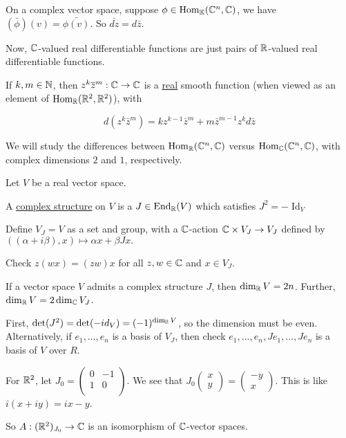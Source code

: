 \documentclass[x11names,reqno,14pt]{extarticle}
\begin{document}
On a complex vector space, suppose $\phi\in{\mathrm{Hom}}_{\mathbb{K}}(\mathbb{C}^n,\mathbb{C})$, we have $(\bar{\phi})(v) = \bar{\phi(v)}.$ So $\bar{dz} = d\bar{z}$. 

Now, $\mathbb{C}$-valued real differentiable functions are just pairs of $\mathbb{R}$-valued real differentiable functions. 

\exm

If $k, m \in \mathbb{N}$, then $z^k\overline{z}^m:\mathbb{C}\to\mathbb{C}$ is a \underline{real} smooth function (when viewed as an element of ${\mathrm{Hom}}_{\mathbb{R}}(\mathbb{R}^2, \mathbb{R}^2)$), with

\[
d(z^k\bar{z}^m) = kz^{k - 1}\bar{z}^m + m\bar{z}^{m - 1}z^kd\bar{z}
\]

We will study the differences between ${\mathrm{Hom}}_{\mathbb{R}}(\mathbb{C}^n, \mathbb{C})$ versus ${\mathrm{Hom}}_{\mathbb{C}}(\mathbb{C}^n, \mathbb{C})$, with complex dimensions $2$ and $1$, respectively. 

 Let $V$ be a real vector space. 

A \underline{complex structure} on $V$ is a $J \in {\mathrm{End}}_{\mathbb{R}}(V)$ which satisfies $J^2 = -\operatorname{Id}_V$

\prop Define $V_J = V$ as a set and group, with a $\mathbb{C}$-action $\mathbb{C}\times V_J \to V_J$ defined by $((\alpha + i\beta), x) \mapsto \alpha x + \beta Jx.$

\proof Check $z(wx) = (zw)x$ for all $z, w \in \mathbb{C}$ and $x \in V_J$. 

\prop If a vector space $V$ admits a complex structure $J$, then $\dim_{\mathbb{R}} V = 2n$. Further, $\dim_{\mathbb{R}} V = 2\dim_{\mathbb{C}} V_J$. 

\proof 

First, $\det(J^2) = \det(-id_V) = (-1)^{\dim_{\mathbb{R}} V}$, so the dimension must be even. Alternatively, if $e_1, \dots, e_n$ is a basis of $V_J$, then check $e_1, \dots, e_n, Je_1, \dots, Je_n$ is a basis of $V$ over $R$.

\exm For $\mathbb{R}^2$, let $J_0 = \begin{pmatrix} 0 & - 1\\ 1 & 0 \\ \end{pmatrix}$. We see that $J_0\begin{pmatrix}x \\ y\end{pmatrix} = \begin{pmatrix} -y \\ x \end{pmatrix}$.  This is like $i(x + iy) = ix - y$.

So $A: (\mathbb{R}^2)_{J_0} \to \mathbb{C}$ is an isomorphism of $\mathbb{C}$-vector spaces. 
\end{document}
